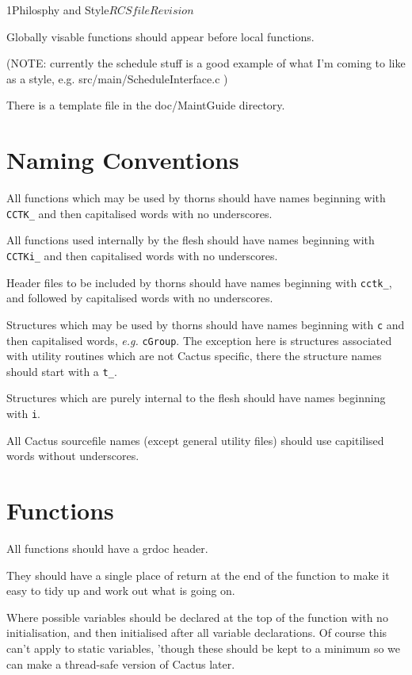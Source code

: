 \begin{cactuspart}{1}{Philosphy and Style}{$RCSfile$}{$Revision$}
\begin{itemize}
\end{itemize}

Globally visable functions should appear before local
functions.

(NOTE: currently the schedule stuff is a good example of
what I'm coming to like as a style, e.g.
src/main/ScheduleInterface.c )

There is a template file in the doc/MaintGuide directory.

\section{Naming Conventions}

All functions which may be used by thorns should have names beginning
with {\tt CCTK\_} and then capitalised words with no underscores.

All functions used internally by the flesh should have names beginning with
{\tt CCTKi\_} and then capitalised words with no underscores.

Header files to be included by thorns should have names beginning with
{\tt cctk\_}, and followed by capitalised words with no underscores.

Structures which may be used by thorns should have names beginning with
{\tt c} and then capitalised words, {\it e.g.} {\tt cGroup}. The 
exception here is structures associated with utility routines which
are not Cactus specific, there the structure names should start with a
{\tt t\_}. 

Structures which are purely internal to the flesh should have
names beginning with {\tt i}.

All Cactus sourcefile names (except general utility files) should 
use capitilised words without underscores.

\section{Functions}

All functions should have a grdoc header.

They should have a single place of return at the end of the function to
make it easy to tidy up and work out what is going on.

Where possible variables should be declared at the top of the function with
no initialisation, and then initialised after all variable declarations. Of
course this can't apply to static variables, 'though these should be kept to
a minimum so we can make a thread-safe version of Cactus later.

\end{cactuspart}
